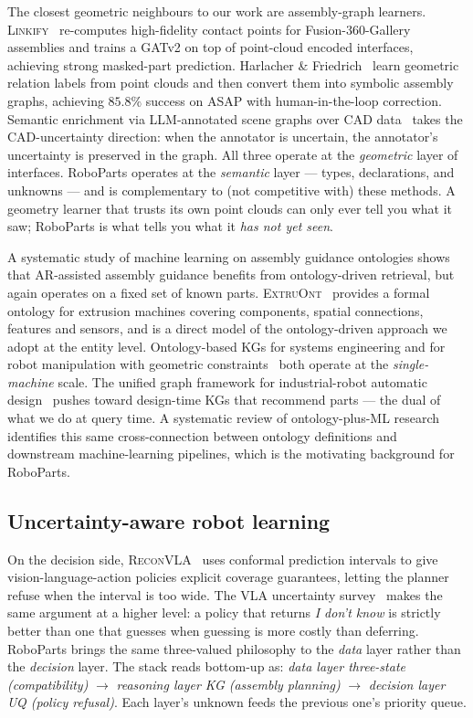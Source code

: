 The closest geometric neighbours to our work are assembly-graph
learners. \textsc{Linkify}~\cite{R1} re-computes high-fidelity
contact points for Fusion-360-Gallery assemblies and trains a GATv2
on top of point-cloud encoded interfaces, achieving strong masked-part
prediction. Harlacher \& Friedrich~\cite{R2} learn geometric relation
labels from point clouds and then convert them into symbolic assembly
graphs, achieving $85.8\%$ success on \textsc{ASAP} with human-in-the-loop
correction. Semantic enrichment via LLM-annotated scene graphs over
CAD data~\cite{R3} takes the CAD-uncertainty direction: when the
annotator is uncertain, the annotator's uncertainty is preserved in
the graph. All three operate at the \emph{geometric} layer of
interfaces. RoboParts operates at the \emph{semantic} layer — types,
declarations, and unknowns — and is complementary to (not
competitive with) these methods. A geometry learner that trusts its
own point clouds can only ever tell you what it saw; RoboParts is
what tells you what it \emph{has not yet seen}.

A systematic study of machine learning on assembly guidance ontologies
\cite{R8} shows that AR-assisted assembly guidance benefits from
ontology-driven retrieval, but again operates on a fixed set of known
parts. \textsc{ExtruOnt}~\cite{R5} provides a formal ontology for
extrusion machines covering components, spatial connections, features
and sensors, and is a direct model of the ontology-driven approach we
adopt at the entity level. Ontology-based KGs for systems engineering
\cite{R6} and for robot manipulation with geometric constraints~\cite{R7}
both operate at the \emph{single-machine} scale. The unified graph
framework for industrial-robot automatic design~\cite{R4} pushes
toward design-time KGs that recommend parts — the dual of what we do
at query time. A systematic review of ontology-plus-ML research
\cite{R9} identifies this same cross-connection between ontology
definitions and downstream machine-learning pipelines, which is the
motivating background for RoboParts.

\subsection{Uncertainty-aware robot learning}

On the decision side, \textsc{ReconVLA}~\cite{R10} uses conformal
prediction intervals to give vision-language-action policies explicit
coverage guarantees, letting the planner refuse when the interval
is too wide. The VLA uncertainty survey~\cite{R11} makes the same
argument at a higher level: a policy that returns \emph{I don't know}
is strictly better than one that guesses when guessing is more
costly than deferring. RoboParts brings the same three-valued
philosophy to the \emph{data} layer rather than the \emph{decision}
layer. The stack reads bottom-up as: \emph{data layer three-state
(compatibility)} $\rightarrow$ \emph{reasoning layer KG (assembly
planning)} $\rightarrow$ \emph{decision layer UQ (policy refusal)}.
Each layer's unknown feeds the previous one's priority queue.

